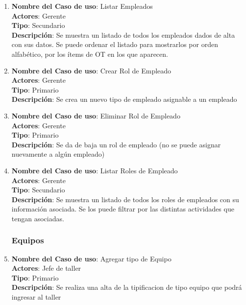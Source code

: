 \documentclass[12pt]{extarticle}
\begin{document}
\begin{spacing}{1.2}
\begin{enumerate}
            \item 	\textbf{Nombre del Caso de uso}: Listar Empleados\\
                    \textbf{Actores}: Gerente\\
                    \textbf{Tipo}: Secundario\\
                    \textbf{Descripción}: Se muestra un listado de todos los empleados dados de alta con sus datos. Se puede ordenar el listado para mostrarlos por orden alfabético, por los ítems de OT en los que aparecen.
            
            \item 	\textbf{Nombre del Caso de uso}: Crear Rol de Empleado\\
                    \textbf{Actores}: Gerente\\
                    \textbf{Tipo}: Primario\\
                    \textbf{Descripción}: Se crea un nuevo tipo de empleado asignable a un empleado
            
            \item 	\textbf{Nombre del Caso de uso}: Eliminar Rol de Empleado\\
                    \textbf{Actores}: Gerente\\
                    \textbf{Tipo}: Primario\\
                    \textbf{Descripción}: Se da de baja un rol de empleado (no se puede asignar nuevamente a algún empleado)
            
            \item 	\textbf{Nombre del Caso de uso}: Listar Roles de Empleado\\
                    \textbf{Actores}: Gerente\\
                    \textbf{Tipo}: Secundario\\
                    \textbf{Descripción}: Se muestra un listado de todos los roles de empleados con su información asociada. Se los puede filtrar por las distintas actividades que tengan asociadas.
            


            \subsubsection{Equipos}



            \item 	\textbf{Nombre del Caso de uso}: Agregar tipo de Equipo\\
                    \textbf{Actores}: Jefe de taller\\
                    \textbf{Tipo}: Primario\\
                    \textbf{Descripción}: Se realiza una alta de la tipificacion de tipo equipo que podrá ingresar al taller 
            

\end{enumerate}
\end{spacing}
\end{document}
